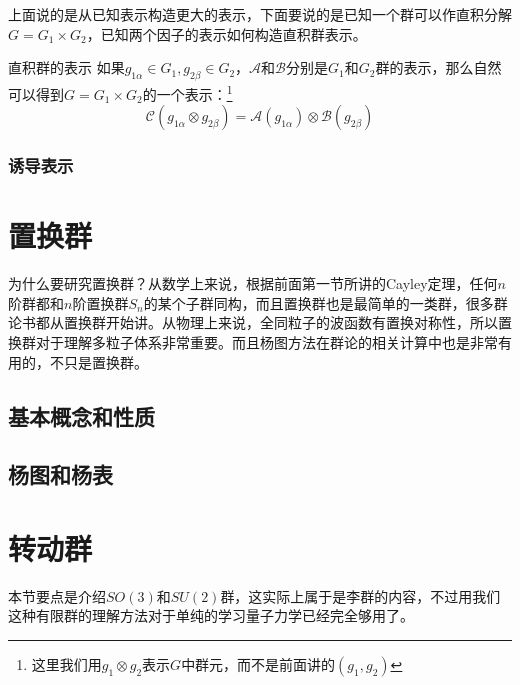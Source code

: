 上面说的是从已知表示构造更大的表示，下面要说的是已知一个群可以作直积分解$G=G_1\times G_2$，已知两个因子的表示如何构造直积群表示。
\begin{define}{直积群的表示}
	如果$g_{1\alpha}\in G_1,g_{2\beta}\in G_2$，$\mathscr{A}$和$\mathscr{B}$分别是$G_1$和$G_2$群的表示，那么自然可以得到$G=G_1\times G_2$的一个表示：\footnote{这里我们用$g_1\otimes g_2$表示$G$中群元，而不是前面讲的$(g_1,g_2)$}
	\[\mathscr{C}(g_{1\alpha}\otimes g_{2\beta})=\mathscr{A}(g_{1\alpha})\otimes\mathscr{B}(g_{2\beta})\]
\end{define}
\subsubsection*{诱导表示}




\section{置换群}
为什么要研究置换群？从数学上来说，根据前面第一节所讲的Cayley定理，任何$n$阶群都和$n$阶置换群$S_n$的某个子群同构，而且置换群也是最简单的一类群，很多群论书都从置换群开始讲。从物理上来说，全同粒子的波函数有置换对称性，所以置换群对于理解多粒子体系非常重要。而且杨图方法在群论的相关计算中也是非常有用的，不只是置换群。
\subsection{基本概念和性质}

\subsection{杨图和杨表}

\section{转动群}
本节要点是介绍$SO(3)$和$SU(2)$群，这实际上属于是李群的内容，不过用我们这种有限群的理解方法对于单纯的学习量子力学已经完全够用了。
